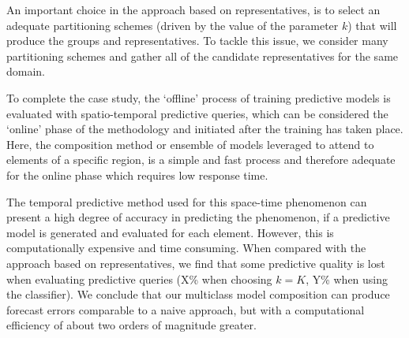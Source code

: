 
An important choice in the approach based on representatives, is to select an adequate partitioning schemes (driven by the value of the parameter $k$) that will produce the groups and representatives. To tackle this issue, we consider many partitioning schemes and gather all of the candidate representatives for the same domain.

To complete the case study, the `offline' process of training predictive models is evaluated with spatio-temporal predictive queries, which can be considered the `online' phase of the methodology and initiated after the training has taken place. Here, the composition method or ensemble of models leveraged to attend to elements of a specific region, is a simple and fast process and therefore adequate for the online phase which requires low response time.

The temporal predictive method used for this space-time phenomenon can present a high degree of accuracy in predicting the phenomenon, if a predictive model is generated and evaluated for each element. However, this is computationally expensive and time consuming. When compared with the approach based on representatives, we find that some predictive quality is lost when evaluating predictive queries (X\% when choosing $k=K$, Y\% when using the classifier). We conclude that our multiclass model composition can produce forecast errors comparable to a naive approach, but with a computational efficiency of about two orders of magnitude greater.



